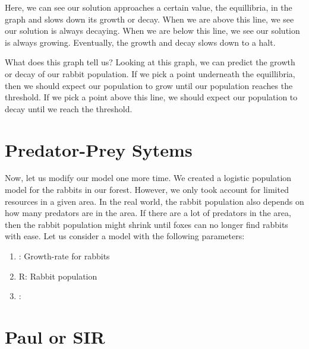 \documentclass{amsart}
\theoremstyle{definition}
\numberwithin{equation}{section}
\begin{document}
\begin{sansmath}

Here, we can see our solution approaches a certain value, the equillibria, in the graph and slows down its growth or decay. When we are above this line, we see our solution is always decaying. When we are below this line, we see our solution is always growing. Eventually, the growth and decay slows down to a halt.

What does this graph tell us? Looking at this graph, we can predict the growth or decay of our rabbit population. If we pick a point underneath the equillibria, then we should expect our population to grow until our population reaches the threshold. If we pick a point above this line, we should expect our population to decay until we reach the threshold.


\section{Predator-Prey Sytems}

Now, let us modify our model one more time. We created a logistic population model for the rabbits in our forest. However, we only took account for limited resources in a given area. In the real world, the rabbit population also depends on how many predators are in the area. If there are a lot of predators in the area, then the rabbit population might shrink until foxes can no longer find rabbits with ease. Let us consider a model with the following parameters:
\begin{enumerate}
  \item \alpha: Growth-rate for rabbits
  \item R: Rabbit population
  \item \beta: 
\end{enumerate}



\section{Paul or SIR}


\newpage


\end{sansmath}
\end{document}
